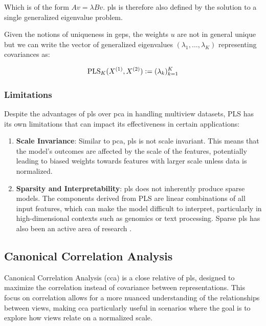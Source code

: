 Which is of the form $A v = \lambda B v$. \acrshort{pls} is therefore also defined by the solution to a single generalized eigenvalue problem.

Given the notions of uniqueness in \acrshort{gep}s, the \gls{weights} $u$ are not in general unique but we can write the vector of generalized eigenvalues $(\lambda_1, \dots, \lambda_K)$ representing covariances as:

\begin{align}
    \label{eq:pls-vector-of-correlations-def}
    \operatorname{PLS}_K(X^{(1)},X^{(2)}) \vcentcolon= (\lambda_k)_{k=1}^K
\end{align}

\subsubsection{Limitations} 

Despite the advantages of \acrshort{pls} over \acrshort{pca} in handling multiview datasets, PLS has its own limitations that can impact its effectiveness in certain applications:
\begin{enumerate}
    \item \textbf{Scale Invariance}: Similar to \acrshort{pca}, \acrshort{pls} is not scale invariant. This means that the model's outcomes are affected by the scale of the features, potentially leading to biased \gls{weights} towards features with larger scale unless data is normalized.
    \item \textbf{Sparsity and Interpretability}: \acrshort{pls} does not inherently produce sparse models. The components derived from PLS are linear combinations of all input features, which can make the model difficult to interpret, particularly in high-dimensional contexts such as genomics or text processing. Sparse \acrshort{pls} has also been an active area of research \citep{chun2010sparse, witten2009penalized}.
\end{enumerate}

\subsection{Canonical Correlation Analysis}\label{sec:cca}

Canonical Correlation Analysis (\acrshort{cca}) is a close relative of \acrshort{pls}, designed to maximize the correlation instead of covariance between representations. This focus on correlation allows for a more nuanced understanding of the relationships between views, making \acrshort{cca} particularly useful in scenarios where the goal is to explore how \gls{views} relate on a normalized scale.

